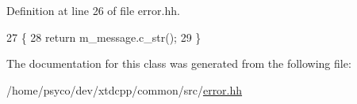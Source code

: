 Definition at line 26 of file error.\+hh.


\begin{DoxyCode}
27   \{
28     \textcolor{keywordflow}{return} m\_message.c\_str();
29   \}
\end{DoxyCode}


The documentation for this class was generated from the following file\+:\begin{DoxyCompactItemize}
\item 
/home/psyco/dev/xtdcpp/common/src/\hyperlink{error_8hh}{error.\+hh}\end{DoxyCompactItemize}
